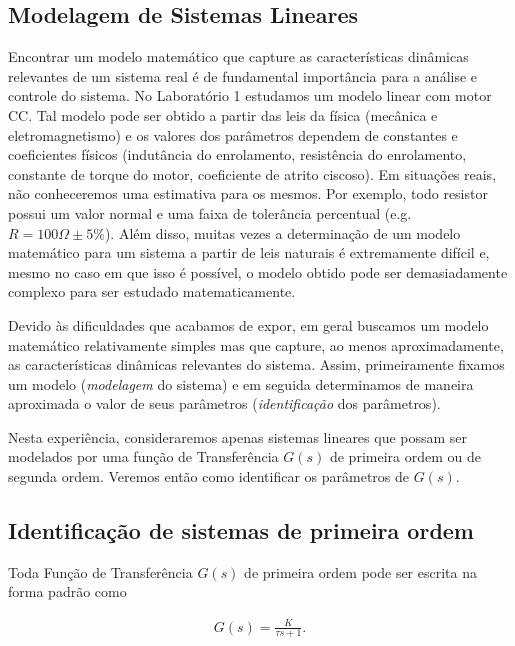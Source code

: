 \documentclass[
]{book}
\begin{document}
\hypertarget{modelagem-de-sistemas-lineares}{%
\subsection{Modelagem de Sistemas Lineares}\label{modelagem-de-sistemas-lineares}}

Encontrar um modelo matemático que capture as características dinâmicas relevantes de um sistema real é de fundamental importância para a análise e controle do sistema. No Laboratório 1 estudamos um modelo linear com motor CC. Tal modelo pode ser obtido a partir das leis da física (mecânica e eletromagnetismo) e os valores dos parâmetros dependem de constantes e coeficientes físicos (indutância do enrolamento, resistência do enrolamento, constante de torque do motor, coeficiente de atrito ciscoso). Em situações reais, não conheceremos uma estimativa para os mesmos. Por exemplo, todo resistor possui um valor normal e uma faixa de tolerância percentual (e.g.~\(R = 100 \Omega \pm 5\%\)). Além disso, muitas vezes a determinação de um modelo matemático para um sistema a partir de leis naturais é extremamente difícil e, mesmo no caso em que isso é possível, o modelo obtido pode ser demasiadamente complexo para ser estudado matematicamente.

Devido às dificuldades que acabamos de expor, em geral buscamos um modelo matemático relativamente simples mas que capture, ao menos aproximadamente, as características dinâmicas relevantes do sistema. Assim, primeiramente fixamos um modelo (\emph{modelagem} do sistema) e em seguida determinamos de maneira aproximada o valor de seus parâmetros (\emph{identificação} dos parâmetros).

Nesta experiência, consideraremos apenas sistemas lineares que possam ser modelados por uma função de Transferência \(G(s)\) de primeira ordem ou de segunda ordem. Veremos então como identificar os parâmetros de \(G(s)\).

\hypertarget{identificauxe7uxe3o-de-sistemas-de-primeira-ordem}{%
\subsection{Identificação de sistemas de primeira ordem}\label{identificauxe7uxe3o-de-sistemas-de-primeira-ordem}}

Toda Função de Transferência \(G(s)\) de primeira ordem pode ser escrita na forma padrão como

\begin{align}
G(s) = \frac{K}{\tau s+1}. \label{eq:eq1}
\end{align}
\end{document}

